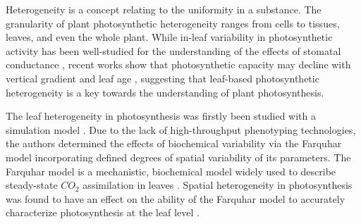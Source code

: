 Heterogeneity is a concept relating to the uniformity in a substance. The granularity of plant photosynthetic heterogeneity ranges from cells to tissues, leaves, and even the whole plant. While in-leaf variability in photosynthetic activity has been well-studied for the understanding of the effects of stomatal conductance \cite{Buckley1997,Cheeseman1991}, recent works show that photosynthetic capacity may decline with vertical gradient and leaf age \cite{chen2008effect,Kitajima2002}, suggesting that leaf-based photosynthetic heterogeneity is a key towards the understanding of plant photosynthesis.

The leaf heterogeneity in photosynthesis was firstly been studied  with a simulation model \cite{chen2008effect}. Due to the lack of high-throughput phenotyping technologies, the authors determined the effects of biochemical variability via the Farquhar model incorporating defined degrees of spatial variability of its parameters. The Farquhar model is a mechanistic, biochemical model widely used to describe steady-state $CO_2$ assimilation in leaves \cite{farquhar2001models,sharkey1985o2}. Spatial heterogeneity in photosynthesis was found to have an effect on the ability of the Farquhar model to accurately characterize photosynthesis at the leaf level \cite{chen2008effect}.

